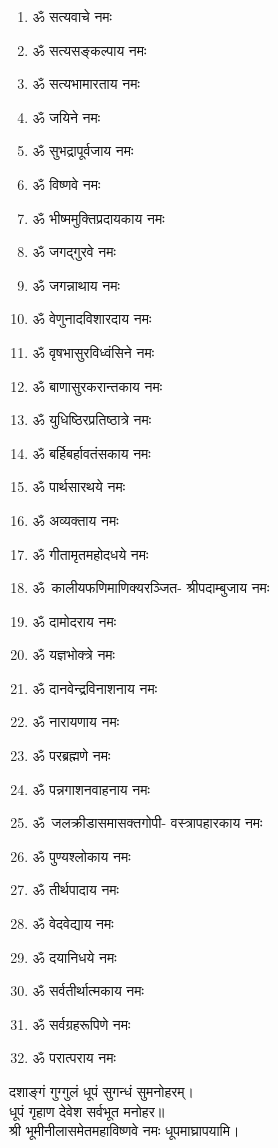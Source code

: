 \begin{multicols}{2}
\begin{enumerate}
\item ॐ सत्यवाचे नमः
\item ॐ सत्यसङ्कल्पाय नमः
\item ॐ सत्यभामारताय नमः
\item ॐ जयिने नमः
\item ॐ सुभद्रापूर्वजाय नमः
\item ॐ विष्णवे नमः
\item ॐ भीष्ममुक्तिप्रदायकाय नमः
\item ॐ जगद्गुरवे नमः
\item ॐ जगन्नाथाय नमः
\item ॐ वेणुनादविशारदाय नमः
\item ॐ वृषभासुरविध्वंसिने नमः
\item ॐ बाणासुरकरान्तकाय नमः
\item ॐ युधिष्ठिरप्रतिष्ठात्रे नमः
\item ॐ बर्हिबर्हावतंसकाय नमः
\item ॐ पार्थसारथये नमः
\item ॐ अव्यक्ताय नमः
\item ॐ गीतामृतमहोदधये नमः
\item \mbox{ॐ~कालीयफणिमाणिक्यरञ्जित-} श्रीपदाम्बुजाय नमः
\item ॐ दामोदराय नमः
\item ॐ यज्ञभोक्त्रे नमः
\item ॐ दानवेन्द्रविनाशनाय नमः
\item ॐ नारायणाय नमः
\item ॐ परब्रह्मणे नमः
\item ॐ पन्नगाशनवाहनाय नमः
\item \mbox{ॐ जलक्रीडासमासक्तगोपी-} वस्त्रापहारकाय नमः
\item ॐ पुण्यश्लोकाय नमः
\item ॐ तीर्थपादाय  नमः
\item ॐ वेदवेद्याय नमः
\item ॐ दयानिधये नमः
\item ॐ सर्वतीर्थात्मकाय नमः
\item ॐ सर्वग्रहरूपिणे नमः
\item ॐ परात्पराय नमः
\end{enumerate}
\end{multicols}
  
दशाङ्गं गुग्गुलं धूपं सुगन्धं सुमनोहरम्।\\
धूपं गृहाण देवेश सर्वभूत मनोहर॥ \\
श्री भूमीनीलासमेतमहाविष्णवे नमः धूपमाघ्रापयामि।\\
 
